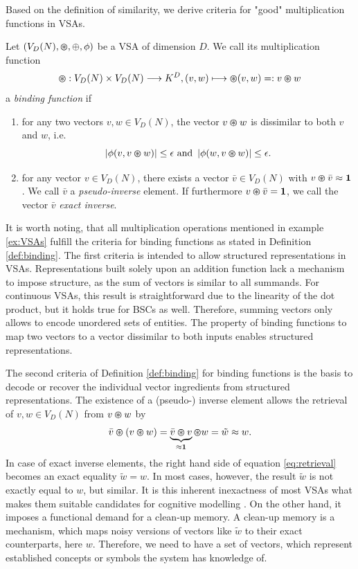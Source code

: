 Based on the definition of similarity, we derive criteria for "good" multiplication functions in \acp{VSA}.
\begin{defn}
	\label{def:binding}
	Let $(V_{D}(N), \varoast, \oplus, \phi)$ be a \acrfull{VSA} of dimension $D$. We call its multiplication function
	\[\varoast: V_{D}(N) \times V_{D}(N) \longrightarrow K^{D}, (v,w) \longmapsto \varoast(v,w) =: v\varoast w\]
	a \emph{binding function} if
	\begin{enumerate}
		\item for any two vectors $v, w \in V_{D}(N)$, the vector $v \varoast w$ is dissimilar to both $v$ and $w$, i.e.
		\[
		\left| \phi(v,v \varoast w) \right| \leq \epsilon \textrm{ and } \left| \phi(w,v \varoast w) \right| \leq \epsilon.
		\]
		\item for any vector $v \in V_{D}(N)$, there exists a vector $\bar{v} \in V_{D}(N)$ with $v \varoast \bar{v} \approx \mathbf{1}$. We call $\bar{v}$ a \emph{pseudo-inverse} element.
		If furthermore $v \varoast \bar{v} = \mathbf{1}$, we call the vector $\bar{v}$ \emph{exact inverse}.
	\end{enumerate}
\end{defn}
It is worth noting, that all multiplication operations mentioned in example \ref{ex:VSAs} fulfill the criteria for binding functions as stated in Definition \ref{def:binding}.
The first criteria is intended to allow structured representations in \acp{VSA}.
Representations built solely upon an addition function lack a mechanism to impose structure, as the sum of vectors is similar to all summands.
For continuous \acp{VSA}, this result is straightforward due to the linearity of the dot product, but it holds true for \acp{BSC} as well.
Therefore, summing vectors only allows to encode unordered sets of entities.
The property of binding functions to map two vectors to a vector dissimilar to both inputs enables structured representations.

The second criteria of Definition \ref{def:binding} for binding functions is the basis to decode or recover the individual vector ingredients from structured representations.
The existence of a (pseudo-) inverse element allows the retrieval of $v,w \in V_{D}(N)$ from $v \varoast w$ by
\begin{equation}
\label{eq:retrieval}
\bar{v} \varoast \left(v \varoast w\right) = \underbrace{\bar{v} \varoast v}_{\approx \mathbf{1}} \varoast w = \tilde{w} \approx w.
\end{equation}
In case of exact inverse elements, the right hand side of equation \ref{eq:retrieval} becomes an exact equality $\tilde{w}=w$.
In most cases, however, the result $\tilde{w}$ is not exactly equal to $w$, but similar.
It is this inherent inexactness of most \acp{VSA} what makes them suitable candidates for cognitive modelling \cite{Eliasmith2013}.
On the other hand, it imposes a functional demand for a clean-up memory.
A clean-up memory is a mechanism, which maps noisy versions of vectors like $\tilde{w}$ to their exact counterparts, here $w$.
Therefore, we need to have a set of vectors, which represent established concepts or symbols the system has knowledge of.

